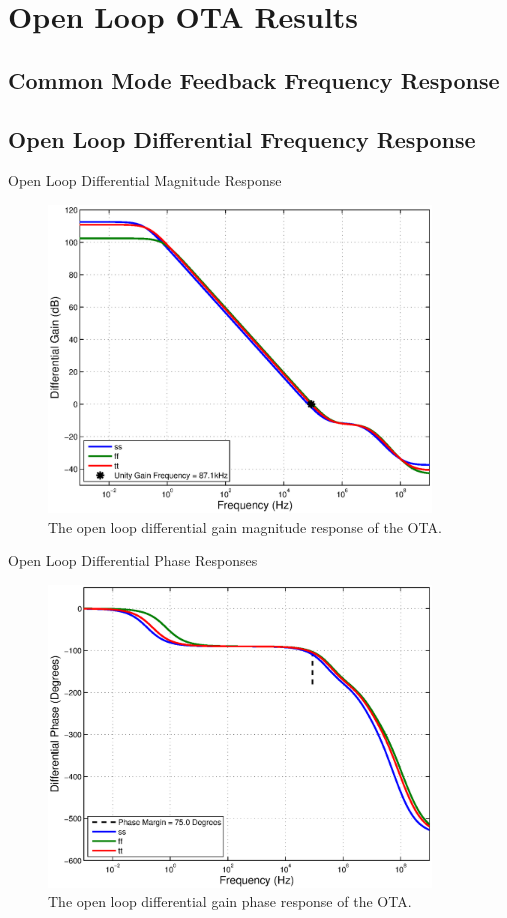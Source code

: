 \documentclass[journal]{IEEEtran}
\begin{document}
\section{Open Loop OTA Results}
\subsection{Common Mode Feedback Frequency Response}

\subsection{Open Loop Differential Frequency Response}
Open Loop Differential Magnitude Response

\begin{figure}
\centering
\includegraphics[width=4in]{Plots/open_dm_gain.eps}
\caption{The open loop differential gain magnitude response of the OTA.}
\label{fig:open_dm_gain}
\end{figure}


Open Loop Differential Phase Responses
\begin{figure}
\centering
\includegraphics[width=4in]{Plots/open_dm_phase.eps}
\caption{The open loop differential gain phase response of the OTA.}
\label{fig:open_dm_phase}
\end{figure}
\end{document}
